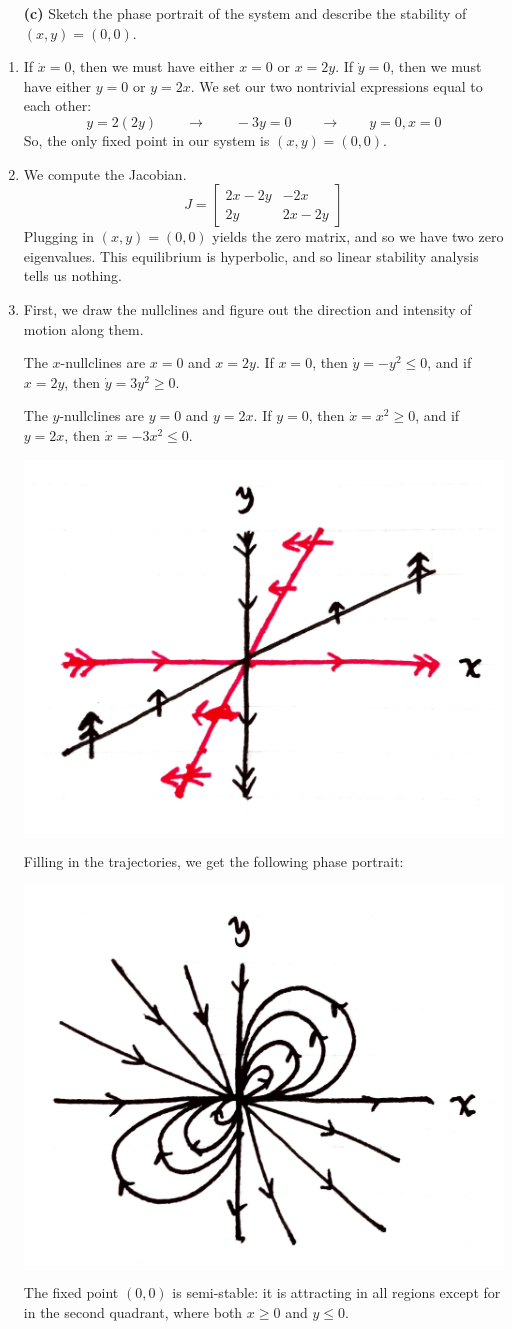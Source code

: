 \documentclass[10pt,letterpaper]{report}
\newcommand{\mtx}[2]{\left[\begin{array}{#1}#2\end{array}\right]}
\begin{document}
\begin{enumerate}
\begin{qbox}
\begin{itemize}
    \item[\textbf{(c)}] Sketch the phase portrait of the system and describe the stability of $(x, y) = (0, 0)$.
\end{itemize}
\end{qbox}

\begin{enumerate}
    \item If $\dot x = 0$, then we must have either $x = 0$ or $x = 2y$. If $\dot y = 0$, then we must have either $y = 0$ or $y = 2x$. We set our two nontrivial expressions equal to each other:
    \[
    y = 2(2y) \qquad \rightarrow \qquad -3y = 0 \qquad \rightarrow \qquad y = 0, x = 0
    \]
    So, the only fixed point in our system is $(x, y) = (0, 0)$.
    
    \item We compute the Jacobian.
    \[
    J = \mtx{cc}{2x - 2y & -2x \\ 2y & 2x -2y}
    \]
    Plugging in $(x, y) = (0, 0)$ yields the zero matrix, and so we have two zero eigenvalues. This equilibrium is hyperbolic, and so linear stability analysis tells us nothing.
    
    \item First, we draw the nullclines and figure out the direction and intensity of motion along them.
    
    The $x$-nullclines are $x = 0$ and $x = 2y$. If $x = 0$, then $\dot y = -y^2 \leq 0$, and if $x = 2y$, then $\dot y = 3y^2 \geq 0$.
    
    The $y$-nullclines are $y = 0$ and $y = 2x$. If $y = 0$, then $\dot x = x^2 \geq 0$, and if $y = 2x$, then $\dot x = -3x^2 \leq 0$.
    
    \begin{center}
    \includegraphics[height=0.3\textwidth]{img/2018S2c1.png}
    \end{center}
    Filling in the trajectories, we get the following phase portrait:
    \begin{center}
    \includegraphics[height=0.3\textwidth]{img/2018S2c2.png}
    \end{center}
    The fixed point $(0, 0)$ is semi-stable: it is attracting in all regions except for in the second quadrant, where both $x \geq 0$ and $y \leq 0$.
\end{enumerate}


\end{enumerate}
\end{document}
